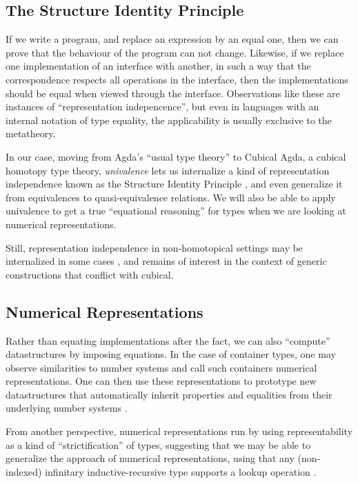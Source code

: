 \documentclass{article}
\theoremstyle{plain}%
\theoremstyle{definition}
\begin{document}
\subsection{The Structure Identity Principle}
If we write a program, and replace an expression by an equal one, then we can prove that the behaviour of the program can not change. Likewise, if we replace one implementation of an interface with another, in such a way that the correspondence respects all operations in the interface, then the implementations should be equal when viewed through the interface. Observations like these are instances of ``representation indepencence'', but even in languages with an internal notation of type equality, the applicability is usually exclusive to the metatheory.

In our case, moving from Agda's ``usual type theory'' to Cubical Agda, a cubical homotopy type theory, \textit{univalence} \cite{cuagda} lets us internalize a kind of representation independence known as the Structure Identity Principle \cite{iri}, and even generalize it from equivalences to quasi-equivalence relations. We will also be able to apply univalence to get a true ``equational reasoning'' for types when we are looking at numerical representations.

Still, representation independence in non-homotopical settings may be internalized in some cases \cite{tgalois}, and remains of interest in the context of generic constructions that conflict with cubical.

\subsection{Numerical Representations}
Rather than equating implementations after the fact, we can also ``compute'' datastructures by imposing equations. In the case of container types, one may observe similarities to number systems \cite{purelyfunctional} and call such containers numerical representations. One can then use these representations to prototype new datastructures that automatically inherit properties and equalities from their underlying number systems \cite{calcdata}.

From another perspective, numerical representations run by using representability as a kind of ``strictification'' of types, suggesting that we may be able to generalize the approach of numerical representations, using that any (non-indexed) infinitary inductive-recursive type supports a lookup operation \cite{glookup}.
\end{document}
